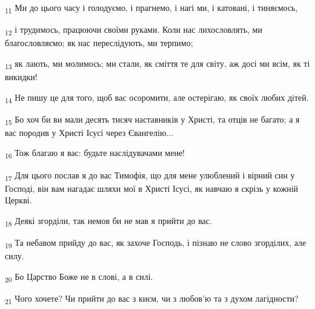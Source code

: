 \begin{tcolorbox}
\textsubscript{11} Ми до цього часу і голодуємо, і прагнемо, і нагі ми, і катовані, і тиняємось,
\end{tcolorbox}
\begin{tcolorbox}
\textsubscript{12} і трудимось, працюючи своїми руками. Коли нас лихословлять, ми благословляємо; як нас переслідують, ми терпимо;
\end{tcolorbox}
\begin{tcolorbox}
\textsubscript{13} як лають, ми молимось; ми стали, як сміття те для світу, аж досі ми всім, як ті викидки!
\end{tcolorbox}
\begin{tcolorbox}
\textsubscript{14} Не пишу це для того, щоб вас осоромити, але остерігаю, як своїх любих дітей.
\end{tcolorbox}
\begin{tcolorbox}
\textsubscript{15} Бо хоч би ви мали десять тисяч наставників у Христі, та отців не багато; а я вас породив у Христі Ісусі через Євангелію...
\end{tcolorbox}
\begin{tcolorbox}
\textsubscript{16} Тож благаю я вас: будьте наслідувачами мене!
\end{tcolorbox}
\begin{tcolorbox}
\textsubscript{17} Для цього послав я до вас Тимофія, що для мене улюблений і вірний син у Господі, він вам нагадає шляхи мої в Христі Ісусі, як навчаю я скрізь у кожній Церкві.
\end{tcolorbox}
\begin{tcolorbox}
\textsubscript{18} Деякі згорділи, так немов би не мав я прийти до вас.
\end{tcolorbox}
\begin{tcolorbox}
\textsubscript{19} Та небавом прийду до вас, як захоче Господь, і пізнаю не слово згорділих, але силу.
\end{tcolorbox}
\begin{tcolorbox}
\textsubscript{20} Бо Царство Боже не в слові, а в силі.
\end{tcolorbox}
\begin{tcolorbox}
\textsubscript{21} Чого хочете? Чи прийти до вас з києм, чи з любов'ю та з духом лагідности?
\end{tcolorbox}
